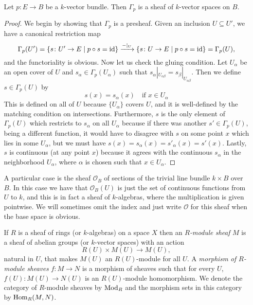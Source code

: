 \documentclass[a4paper,openany]{scrbook}
\begin{document}
\begin{prop}
Let $p\colon E \to B$ be a $k$-vector bundle. Then $\Gamma_p$ is a sheaf of $k$-vector spaces on $B$.
\end{prop}
\begin{proof}
We begin by showing that $\Gamma_p$ is a presheaf. Given an inclusion $U \subseteq U'$, we have a canonical restriction map
\[
\Gamma_p(U') = \{s \colon U' \to E \mid p \circ s = \operatorname{id}\} \xrightarrow{-|_U} \{s \colon U \to E \mid p \circ s = \operatorname{id}\} = \Gamma_p(U),
\]
and the functoriality is obvious. Now let us check the gluing condition. Let $U_\alpha$ be an open cover of $U$ and $s_\alpha \in \Gamma_p(U_\alpha)$ such that $s_\alpha|_{U_{\alpha\beta}} = s_\beta|_{U_{\alpha\beta}}$. Then we define $s \in \Gamma_p(U)$ by
\[
s(x) = s_\alpha(x) \quad \text{if } x \in U_\alpha
\]
This is defined on all of $U$ because $\{U_\alpha\}$ covers $U$, and it is well-defined by the matching condition on intersections. Furthermore, $s$ is the only element of $\Gamma_p(U)$ which restricts to $s_\alpha$ on all $U_\alpha$ because if there was another $s' \in \Gamma_p(U)$, being a different function, it would have to disagree with $s$ on some point $x$ which lies in some $U_\alpha$, but we must have $s(x) = s_\alpha(x) = s'_\alpha(x) = s'(x)$. Lastly, $s$ is continuous (at any point $x$) because it agrees with the continuous $s_\alpha$ in the neighborhood $U_\alpha$, where $\alpha$ is chosen such that $x \in U_\alpha$.
\end{proof}

\begin{example}
A particular case is the sheaf $\mathcal O_B$ of sections of the trivial line bundle $k \times B$ over $B$. In this case we have that $\mathcal O_B(U)$ is just the set of continuous functions from $U$ to $k$, and this is in fact a sheaf of $k$-algebras, where the multiplication is given pointwise. We will sometimes omit the index and just write $\mathcal O$ for this sheaf when the base space is obvious.
\end{example}

If $R$ is a sheaf of rings (or $k$-algebras) on a space $X$ then an \emph{$R$-module sheaf $M$} is a sheaf of abelian groups (or $k$-vector spaces) with an action
\[
R(U) \times M(U) \to M(U),
\]
natural in $U$, that makes $M(U)$ an $R(U)$-module for all $U$. A \emph{morphism of $R$-module sheaves} $f\colon M \to N$ is a morphism of sheaves such that for every $U$, $f(U)\colon M(U) \to N(U)$ is an $R(U)$-module homomorphism. We denote the category of $R$-module sheaves by $\operatorname{Mod}_R$ and the morphism sets in this category by $\operatorname{Hom}_R(M,N)$.
\end{document}
